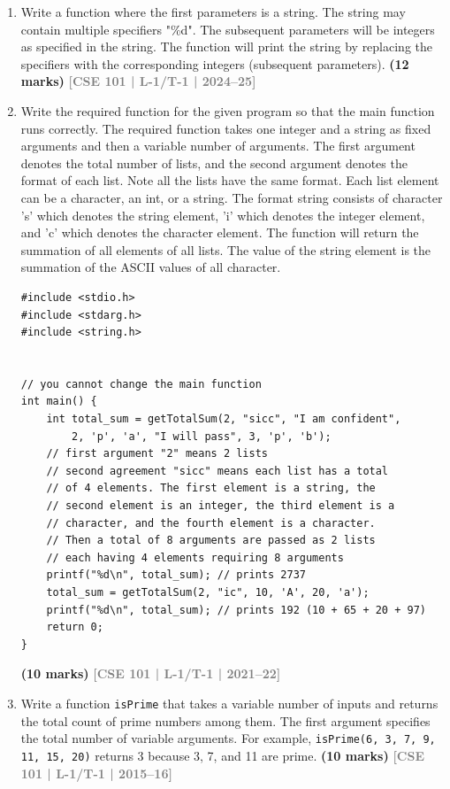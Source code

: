 \documentclass[12pt,a3paper]{article}
\newcommand{\yr}[1]{\hfill\textcolor{gray}{\small\textbf{[#1]}}}
\newcommand{\mk}[1]{\textcolor{orange!70!black}{\small\textbf{(#1 marks)}}}
\begin{document}
\begin{enumerate}


\item Write a function where the first parameters is a string. The string may contain multiple specifiers "\%d". The subsequent parameters will be integers as specified in the string. The function will print the string by replacing the specifiers with the corresponding integers (subsequent parameters).
\mk{12}  \yr{CSE 101 | L-1/T-1 | 2024--25}


\item Write the required function for the given program so that the main function runs correctly. The required function takes one integer and a string as fixed arguments and then a variable number of arguments. The first argument denotes the total number of lists, and the second argument denotes the format of each list. Note all the lists have the same format. Each list element can be a character, an int, or a string. The format string consists of character 's' which denotes the string element, 'i' which denotes the integer element, and 'c' which denotes the character element. The function will return the summation of all elements of all lists. The value of the string element is the summation of the ASCII values of all character.
\begin{lstlisting}
#include <stdio.h>
#include <stdarg.h>
#include <string.h>


// you cannot change the main function
int main() {
    int total_sum = getTotalSum(2, "sicc", "I am confident", 
        2, 'p', 'a', "I will pass", 3, 'p', 'b');
    // first argument "2" means 2 lists
    // second agreement "sicc" means each list has a total 
    // of 4 elements. The first element is a string, the 
    // second element is an integer, the third element is a 
    // character, and the fourth element is a character.
    // Then a total of 8 arguments are passed as 2 lists 
    // each having 4 elements requiring 8 arguments
    printf("%d\n", total_sum); // prints 2737
    total_sum = getTotalSum(2, "ic", 10, 'A', 20, 'a');
    printf("%d\n", total_sum); // prints 192 (10 + 65 + 20 + 97)
    return 0;
}
\end{lstlisting}
\mk{10} \yr{CSE 101 | L-1/T-1 | 2021--22}

\item Write a function \texttt{isPrime} that takes a variable number of inputs and returns the total count of prime numbers among them. The first argument specifies the total number of variable arguments. For example, \texttt{isPrime(6, 3, 7, 9, 11, 15, 20)} returns 3 because 3, 7, and 11 are prime.
\mk{10} \yr{CSE 101 | L-1/T-1 | 2015--16}


\end{enumerate}
\end{document}
